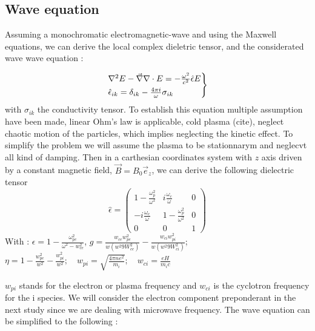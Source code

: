 \documentclass[11pt,a4paper]{report}
\begin{document}
\begin{multicols}{2}
    \subsection{Wave equation}
    Assuming a monochromatic electromagnetic-wave and using the Maxwell equations, we can derive the local complex dieletric tensor, and the considerated wave wave equation :

    \begin{equation}
        \begin{rcases}
            \laplacian E -  \vec{\nabla}\nabla \cdot E = -\frac{\omega^2}{c^2} \hat{\epsilon} E \\
            \hat{\epsilon}_{ik} = \delta _{ik} - \frac{4\pi i}{\omega} \sigma_{ik}
        \end{rcases}
    \end{equation}
    with $\sigma_{ik}$ the conductivity tensor. To establish this equation multiple assumption have been made, linear Ohm's law is applicable, cold plasma (cite), neglect chaotic motion of the particles, which implies neglecting the kinetic effect. To simplify the problem we will assume the plasma to be stationnarym and neglecvt all kind of damping. Then in a carthesian coordinates system with $z$ axis driven by a constant magnetic field,
    $\vec{B} = B_0\vec{e}_z$, we can derive the following dielectric tensor
    $$\hat{\epsilon} = \begin{pmatrix}
            1 - \frac{\omega_p^2}{\omega^2} & i\frac{\omega_c}{\omega}        & 0 \\
            -i\frac{\omega_c}{\omega}       & 1 - \frac{\omega_p^2}{\omega^2} & 0 \\
            0                               & 0                               & 1
        \end{pmatrix}$$
    With : $\epsilon = 1 - \frac{\omega_{pe}^2}{\omega^2 - w_{ce}^2}$, $g = \frac{w_{ce}w_{pe}^2}{w(w^2 9 W_{ce}^2)} - \frac{w_{ci}w_{pi}^2}{w(w^2 9 W_{ci}^2)}$;
    $ \eta  = 1 - \frac{w_{pe}^2}{w^2} -  \frac{w_{pi}^2}{w^2}; \quad w_{pi} = \sqrt{\frac{4\pi n e^2}{m_i}}; \quad w_{ci} = \frac{eH}{m_i c}$

    $w_{pi}$ stands for the electron or plasma frequency and $w_{ci}$ is the cyclotron frequency for the i species. We will consider the electron component preponderant in the next study since we are dealing with microwave frequency. The wave equation can be simplified to the following :


\end{multicols}
\end{document}
